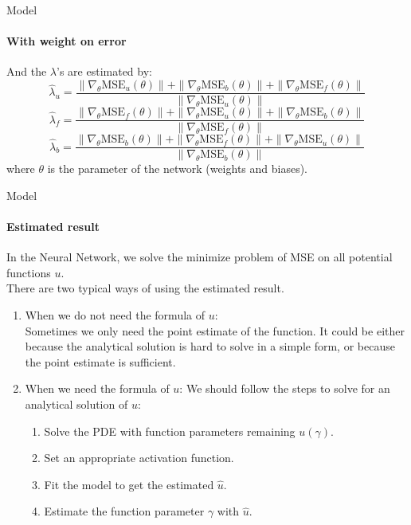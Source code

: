     \begin{frame}{Model}
    \framesubtitle{With weight on error}
        And the \( \lambda \)'s are estimated by:
        \begin{equation}
        \hat{\lambda}_u = \frac{\| \nabla_{\theta} \text{MSE}_u (\theta) \| + \| \nabla_{\theta} \text{MSE}_b (\theta) \| + \| \nabla_{\theta} \text{MSE}_f (\theta) \|}{\| \nabla_{\theta} \text{MSE}_u (\theta) \|}
        \end{equation}
        \begin{equation}
        \hat{\lambda}_f = \frac{\| \nabla_{\theta} \text{MSE}_f (\theta) \| + \| \nabla_{\theta} \text{MSE}_u (\theta) \| + \| \nabla_{\theta} \text{MSE}_b (\theta) \|}{\| \nabla_{\theta} \text{MSE}_f (\theta) \|}
        \end{equation}
        \begin{equation}
        \hat{\lambda}_b = \frac{\| \nabla_{\theta} \text{MSE}_b (\theta) \| + \| \nabla_{\theta} \text{MSE}_f (\theta) \| + \| \nabla_{\theta} \text{MSE}_u (\theta) \|}{\| \nabla_{\theta} \text{MSE}_b (\theta) \|}
        \end{equation}
        where \( \theta \) is the parameter of the network (weights and biases).
    \end{frame}
    
    \begin{frame}{Model}
    \framesubtitle{Estimated result}
        In the Neural Network, we solve the minimize problem of MSE on all potential functions \( u \).\\
        There are two typical ways of using the estimated result.
        \begin{enumerate}
            \item When we do not need the formula of \( u \):\\
            Sometimes we only need the point estimate of the function. It could be either because the analytical solution is hard to solve in a simple form, or because the point estimate is sufficient.
            
            \item When we need the formula of \( u \):
            We should follow the steps to solve for an analytical solution of \( u \):
            \begin{enumerate}
                \item Solve the PDE with function parameters remaining \( u(\gamma) \).
                \item Set an appropriate activation function.
                \item Fit the model to get the estimated \( \hat{u} \).
                \item Estimate the function parameter \( \gamma \) with \( \hat{u} \).
            \end{enumerate}
        \end{enumerate}
    \end{frame}
    
